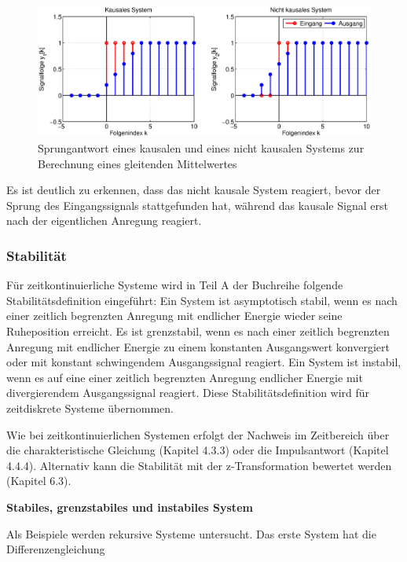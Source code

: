 \begin{figure}[H]
  \centerline{\includegraphics[width=1\textwidth]{Kapitel4/Bilder/image9.eps}}
  \caption{Sprungantwort eines kausalen und eines nicht kausalen Systems zur Berechnung eines gleitenden Mittelwertes}
  \label{fig:GleitenderMittelwertKausal}
\end{figure}

\noindent Es ist deutlich zu erkennen, dass das nicht kausale System reagiert, bevor der Sprung des Eingangssignals stattgefunden hat, w\"{a}hrend das kausale Signal erst nach der eigentlichen Anregung reagiert.

\subsubsection{Stabilit\"{a}t}

\noindent F\"{u}r zeitkontinuierliche Systeme wird in Teil A der Buchreihe folgende Stabilit\"{a}tsdefinition eingef\"{u}hrt: Ein System ist asymptotisch stabil, wenn es nach einer zeitlich begrenzten Anregung mit endlicher Energie wieder seine Ruheposition erreicht. Es ist grenzstabil, wenn es nach einer zeitlich begrenzten Anregung mit endlicher Energie zu einem konstanten Ausgangswert konvergiert oder mit konstant schwingendem Ausgangssignal reagiert. Ein System ist instabil, wenn es auf eine einer zeitlich begrenzten Anregung endlicher Energie mit divergierendem Ausgangssignal reagiert. Diese Stabilit\"{a}tsdefinition wird f\"{u}r zeitdiskrete Systeme \"{u}bernommen.\medskip

\noindent Wie bei zeitkontinuierlichen Systemen erfolgt der Nachweis im Zeitbereich \"{u}ber die charakteristische Gleichung (Kapitel 4.3.3) oder die Impulsantwort (Kapitel 4.4.4). Alternativ kann die Stabilit\"{a}t mit der z-Transformation bewertet werden (Kapitel 6.3).\bigskip

{\selectfont
\noindent\textbf{Stabiles, grenzstabiles und instabiles System}} \smallskip

\noindent Als Beispiele werden rekursive Systeme untersucht. Das erste System hat die Differenzengleichung 

